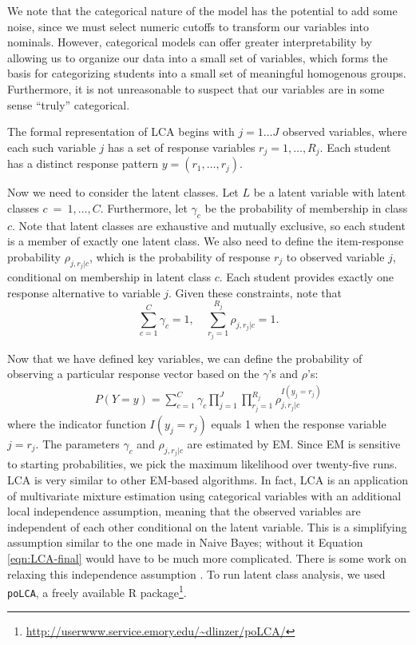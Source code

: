 \documentclass{edm_template}
\begin{document}
We note that the categorical nature of the model has the potential to add some noise, since we must select numeric cutoffs to transform our variables into nominals. However, categorical models can offer greater interpretability by allowing us to organize our data into a small set of variables, which forms the basis for categorizing students into a small set of meaningful homogenous groups. Furthermore, it is not unreasonable to suspect that our variables are in some sense ``truly'' categorical. 

The formal representation of LCA begins with $j = 1 \ldots J$ observed variables, where each such variable $j$ has a set of response variables $r_{j} = 1,\ldots,R_{j}$. Each student has a distinct response pattern $y = (r_{1},\ldots,r_{j})$.

Now we need to consider the latent classes. Let $L$ be a latent variable with latent classes $c~=~1,\ldots,C$. Furthermore, let $\gamma_{c}$ be the probability of membership in class $c$. Note that latent classes are exhaustive and mutually exclusive, so each student is a member of exactly one latent class. We also need to define the item-response probability $\rho_{j,r_{j}|c}$, which is the probability of response $r_{j}$ to observed variable $j$, conditional on membership in latent class $c$. Each student provides exactly one response alternative to variable $j$. Given these constraints, note that
\[ \sum_{c=1}^{C} \gamma_{c} = 1,\quad \sum_{r_{j}=1}^{R_{j}} \rho_{j,r_{j}|c} = 1. \] 

Now that we have defined key variables, we can define the probability of observing a particular response vector based on the $\gamma$'s and $\rho$'s:
\begin{align}
P(Y = y) = \sum_{c=1}^{C} \gamma_{c} \prod_{j=1}^{J} \prod_{r_{j}=1}^{R_{j}} \rho_{j,r_{j}|c}^{I(y_{j} = r_{j})}
\label{eqn:LCA-final}
\end{align}
where the indicator function $I(y_{j} = r_{j})$ equals 1 when the response variable $j = r_{j}$. The parameters $\gamma_{c}$ and $\rho_{j,r_{j}|c}$ are estimated by EM. Since EM is sensitive to starting probabilities, we pick the maximum likelihood over twenty-five runs. LCA is very similar to other EM-based algorithms. In fact, LCA is an application of multivariate mixture estimation using categorical variables with an additional local independence assumption, meaning that the observed variables are independent of each other conditional on the latent variable. This is a simplifying assumption similar to the one made in Naive Bayes; without it Equation \ref{eqn:LCA-final} would have to be much more complicated. There is some work on relaxing this independence assumption \cite{Hagenaars1988}. To run latent class analysis, we used \texttt{poLCA}, a freely available R package\footnote{\url{http://userwww.service.emory.edu/~dlinzer/poLCA/}}.
\end{document}
